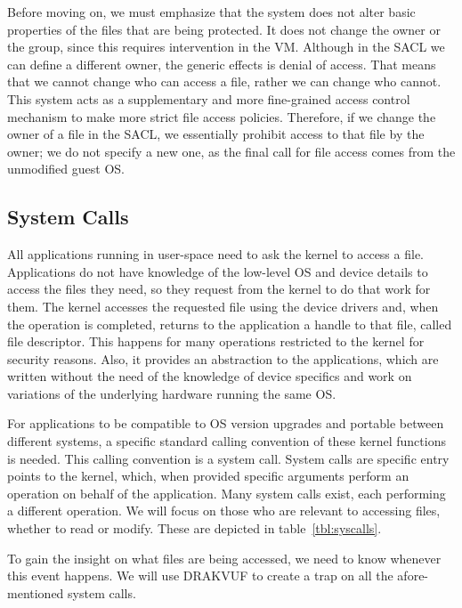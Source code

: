 \par Before moving on, we must emphasize that the system does not alter basic properties of the files that are being protected. It does not change the owner or the group, since this requires intervention in the \ac{VM}. Although in the \ac{SACL} we can define a different owner, the generic effects is denial of access. That means that we cannot change who can access a file, rather we can change who cannot. This system acts as a supplementary and more fine-grained access control mechanism to make more strict file access policies. Therefore, if we change the owner of a file in the \ac{SACL}, we essentially prohibit access to that file by the owner; we do not specify a new one, as the final call for file access comes from the unmodified guest \ac{OS}.



\subsection{System Calls}\label{sub:syscalls}


\par All applications running in user-space need to ask the kernel to access a file. Applications do not have knowledge of the low-level \ac{OS} and device details to access the files they need, so they request from the kernel to do that work for them. The kernel accesses the requested file using the device drivers and, when the operation is completed, returns to the application a handle to that file, called file descriptor. This happens for many operations restricted to the kernel for security reasons. Also, it provides an abstraction to the applications, which are written without the need of the knowledge of device specifics and work on variations of the underlying hardware running the same \ac{OS}. 

\par For applications to be compatible to \ac{OS} version upgrades and portable between different systems, a specific standard calling convention of these kernel functions is needed. This calling convention is a system call. System calls are specific entry points to the kernel, which, when provided specific arguments perform an operation on behalf of the application. Many system calls exist, each performing a different operation. We will focus on those who are relevant to accessing files, whether to read or modify. These are depicted in table~\ref{tbl:syscalls}.

\par To gain the insight on what files are being accessed, we need to know whenever this event happens. We will use DRAKVUF to create a trap on all the afore-mentioned system calls.

